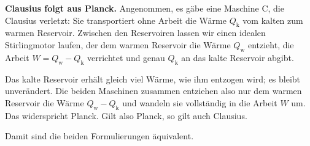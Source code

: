 \textbf{Clausius folgt aus Planck.} Angenommen, es gäbe eine Maschine C, die Clausius verletzt: Sie transportiert ohne Arbeit die Wärme $Q_\text{k}$ vom kalten zum warmen Reservoir. Zwischen den Reservoiren lassen wir einen idealen Stirlingmotor laufen, der dem warmen Reservoir die Wärme $Q_\text{w}$ entzieht, die Arbeit $W = Q_\text{w}-Q_\text{k}$ verrichtet und genau $Q_\text{k}$ an das kalte Reservoir abgibt.
\begin{center}
\end{center}
Das kalte Reservoir erhält gleich viel Wärme, wie ihm entzogen wird; es bleibt unverändert. Die beiden Maschinen zusammen entziehen also nur dem warmen Reservoir die Wärme $Q_\text{w}-Q_\text{k}$ und wandeln sie vollständig in die Arbeit $W$ um. Das widerspricht Planck. Gilt also Planck, so gilt auch Clausius.

Damit sind die beiden Formulierungen äquivalent.
